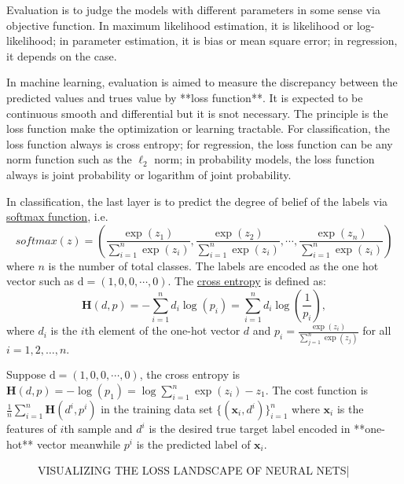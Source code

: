\documentclass[titlestyle=hang,11pt]{elegantbook}
\begin{document}
Evaluation is to judge the models with different parameters in some sense via objective function.
In maximum likelihood estimation, it is likelihood or log-likelihood;
in parameter estimation, it is bias or mean square error;
in regression, it depends on the case.

In machine learning, evaluation is aimed to  measure the discrepancy between the predicted values and trues value by **loss function**.
It is expected to be continuous smooth and differential but it is snot necessary.
The principle is the loss function make the optimization or learning tractable.
For classification, the loss function always is cross entropy;
for regression, the loss function can be any norm function such as the $\ell_2$ norm;
in probability models, the loss function always is joint probability or logarithm of joint probability.

In classification, the last layer is to predict the degree of belief of the labels via \href{http://freemind.pluskid.org/machine-learning/softmax-vs-softmax-loss-numerical-stability/}{softmax function},
i.e.
$$softmax(z)=(\frac{\exp(z_1)}{\sum_{i=1}^{n}\exp(z_i)},\frac{\exp(z_2)}{\sum_{i=1}^{n} \exp(z_i)}, \cdots, \frac{\exp(z_n)}{\sum_{i=1}^{n}\exp(z_i)})$$
where $n$ is the number of total classes. 
The labels are encoded as the one hot vector such as $\mathrm{d}=(1,0,0,\cdots,0)$. The \href{https://www.cnblogs.com/smartwhite/p/8601477.html}{cross entropy} is defined as:
$$ \mathbf{H}(d,p)=-\sum_{i=1}^{n}d_i\log(p_i)=\sum_{i=1}^{n}d_i\log(\frac{1}{p_i}),$$
where $d_i$ is the $i$th element of the one-hot vector $d$ and $p_i=\frac{\exp(z_i)}{\sum_{j=1}^{n}\exp(z_j)}$ for all $i=1,2, \dots, n.$

Suppose $\mathrm{d}=(1,0,0,\cdots,0)$, the cross entropy is $\mathbf{H}(d,p)=-\log(p_1)=\log \sum_{i=1}^{n}\exp(z_i)-z_1$. 
The cost function is $\frac{1}{n}\sum_{i=1}^{n}\mathbf{H}(d^{i},p^{i})$ in the training data set $\{(\mathbf{x}_i,d^i)\}_{i=1}^{n}$ where $\mathbf{x}_i$ is the features of $i$th sample and $d^i$ is the desired true target label encoded in **one-hot** vector meanwhile $p^{i}$ is the predicted label of $\mathbf{x}_i$.

\begin{figure}[H]
\centering
  \caption{VISUALIZING THE LOSS LANDSCAPE OF NEURAL NETS|}
\label{fig: visual loss}
\end{figure}
\end{document}

